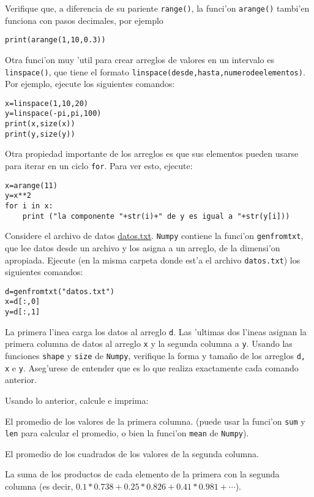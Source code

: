 \documentclass[11pt]{exam}
\begin{document}
\begin{questions}
\item Verifique que, a diferencia de su pariente \texttt{range()}, la funci'on \texttt{arange()} tambi'en funciona con pasos decimales, por ejemplo
\begin{verbatim}
print(arange(1,10,0.3))
\end{verbatim}

\item Otra funci'on muy 'util para crear arreglos de valores en un intervalo es \texttt{linspace()}, que tiene el formato \texttt{linspace(desde,hasta,numerodeelementos)}. Por ejemplo, ejecute los siguientes comandos:
\begin{verbatim}
x=linspace(1,10,20)
y=linspace(-pi,pi,100)
print(x,size(x))
print(y,size(y))
\end{verbatim}

\item Otra propiedad importante de los arreglos es que sus elementos pueden usarse para iterar en un ciclo \texttt{for}. Para ver esto, ejecute:
\begin{verbatim}
x=arange(11)
y=x**2
for i in x:
	print ("la componente "+str(i)+" de y es igual a "+str(y[i]))
\end{verbatim}

\item Considere el archivo de datos \href{https://drive.google.com/file/d/0B4RSIcYW5V0HSGM1dzlxRGFRYkE/view?usp=sharing}{datos.txt}. \texttt{Numpy} contiene la funci'on \texttt{genfromtxt}, que lee datos desde un archivo y los asigna a un arreglo, de la dimensi'on apropiada. Ejecute (en la misma carpeta donde est'a el archivo \texttt{datos.txt}) los siguientes comandos:
\begin{verbatim}
d=genfromtxt("datos.txt")
x=d[:,0]
y=d[:,1]
\end{verbatim}
La primera l'inea carga los datos al arreglo \texttt{d}. Las 'ultimas dos l'ineas asignan la primera columna de datos al arreglo \texttt{x} y la segunda columna a \texttt{y}. Usando las funciones \texttt{shape} y \texttt{size} de \texttt{Numpy}, verifique la forma y tama\~no de los arreglos \texttt{d, x} e \texttt{y}. Aseg'urese de entender que es lo que realiza exactamente cada comando anterior.

\item Usando lo anterior, calcule e imprima:
\begin{parts}
\item El promedio de los valores de la primera columna. (puede usar la funci'on \texttt{sum} y \texttt{len} para calcular el promedio, o bien la funci'on \texttt{mean} de \texttt{Numpy}).
\item El promedio de los cuadrados de los valores de la segunda columna.
\item La suma de los productos de cada elemento de la primera con la segunda columna (es decir, $0.1*0.738 + 0.25 *	0.826 + 0.41 * 0.981 +\cdots$).
\end{parts}


\end{questions}
\end{document}
